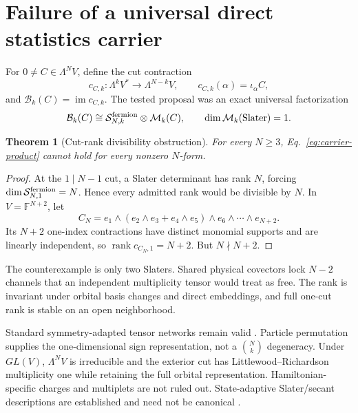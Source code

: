 \documentclass[11pt]{article}
\newtheorem{theorem}{Theorem}[section]
\theoremstyle{definition}
\newcommand{\rank}{\operatorname{rank}}
\newcommand{\im}{\operatorname{im}}
\begin{document}
\section{Failure of a universal direct statistics carrier}

For $0\ne C\in\Lambda^N V$, define the cut contraction
\[
 c_{C,k}:\Lambda^kV^*\longrightarrow\Lambda^{N-k}V,
 \qquad c_{C,k}(\alpha)=\iota_\alpha C,
\]
and $\mathcal B_k(C)=\im c_{C,k}$.  The tested proposal was an exact universal
factorization
\begin{equation}
 \mathcal B_k(C)\cong
 \mathcal S^{\rm fermion}_{N,k}\otimes\mathcal M_k(C),
 \qquad \dim\mathcal M_k(\text{Slater})=1.
 \label{eq:carrier-product}
\end{equation}

\begin{theorem}[Cut-rank divisibility obstruction]
For every $N\ge3$, Eq.~\eqref{eq:carrier-product} cannot hold for every
nonzero $N$-form.
\end{theorem}

\begin{proof}
At the $1\mid N-1$ cut, a Slater determinant has rank $N$, forcing
$\dim\mathcal S^{\rm fermion}_{N,1}=N$.  Hence every admitted rank would be
divisible by $N$.  In $V=\mathbb F^{N+2}$, let
\[
 C_N=e_1\wedge(e_2\wedge e_3+e_4\wedge e_5)
 \wedge e_6\wedge\cdots\wedge e_{N+2}.
\]
Its $N+2$ one-index contractions have distinct monomial supports and are
linearly independent, so $\rank c_{C_N,1}=N+2$.  But $N\nmid N+2$.
\end{proof}

The counterexample is only two Slaters.  Shared physical covectors lock
$N-2$ channels that an independent multiplicity tensor would treat as free.
The rank is invariant under orbital basis changes and direct embeddings, and
full one-cut rank is stable on an open neighborhood.

Standard symmetry-adapted tensor networks remain valid
\cite{SinghPfeiferVidal2010SymmetryTN,Weichselbaum2012NonAbelianTN}.
Particle permutation supplies the one-dimensional sign representation, not a
$\binom{N}{k}$ degeneracy.  Under $GL(V)$, $\Lambda^N V$ is irreducible and the
exterior cut has Littlewood--Richardson multiplicity one while retaining the
full orbital representation.  Hamiltonian-specific charges and multiplets are
not ruled out.  State-adaptive Slater/secant descriptions are established and
need not be canonical \cite{SchliemannCiracKusEtAl2001SlaterRank,
BallicoBernardiCatalisanoChiantini2013GrassmannSecants,
GalganoStaffolani2024GrassmannianIdentifiability}.
\end{document}
